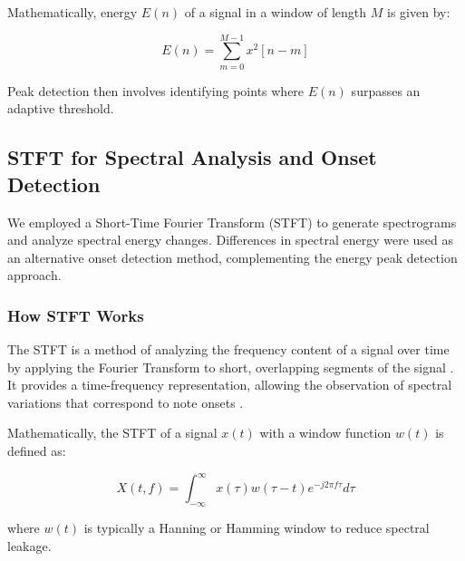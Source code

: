 \documentclass{article}
\begin{document}
Mathematically, energy $E(n)$ of a signal in a window of length $M$ is given by:

\begin{equation}
E(n) = \sum_{m=0}^{M-1} x^2[n-m]
\end{equation}

Peak detection then involves identifying points where $E(n)$ surpasses an adaptive threshold.

\subsection{STFT for Spectral Analysis and Onset Detection}
We employed a Short-Time Fourier Transform (STFT) to generate spectrograms and analyze spectral energy changes. Differences in spectral energy were used as an alternative onset detection method, complementing the energy peak detection approach.

\subsubsection{How STFT Works}
The STFT is a method of analyzing the frequency content of a signal over time by applying the Fourier Transform to short, overlapping segments of the signal \cite{Benetos2009}. It provides a time-frequency representation, allowing the observation of spectral variations that correspond to note onsets \cite{onset-detection}.

Mathematically, the STFT of a signal $x(t)$ with a window function $w(t)$ is defined as:

\begin{equation}
X(t, f) = \int_{-\infty}^{\infty} x(\tau) w(\tau - t) e^{-j 2\pi f \tau} d\tau
\end{equation}

where $w(t)$ is typically a Hanning or Hamming window to reduce spectral leakage.
\end{document}
